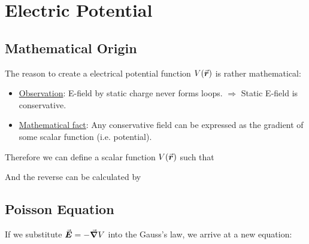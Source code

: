 \documentclass[class=article, crop=false, 12pt]{standalone}
\begin{document}
\begin{example}
\end{example}



\linesep
\section{Electric Potential}

\subsection{Mathematical Origin}

The reason to create a electrical potential function $V(\va*{r})$ is rather mathematical:
\begin{itemize}
    \item \ul{Observation}: 
    E-field by static charge never forms loops.
    $\Rightarrow$ Static E-field is conservative.

    \item \ul{Mathematical fact}: 
    Any conservative field can be expressed as the gradient of some scalar function (i.e. potential).
\end{itemize}

Therefore we can define a scalar function $V(\va*{r})$ such that 

And the reverse can be calculated by 

\subsection{Poisson Equation}

If we substitute $\va*{E} = -\grad V$ into the Gauss's law,
we arrive at a new equation: 
\end{document}
